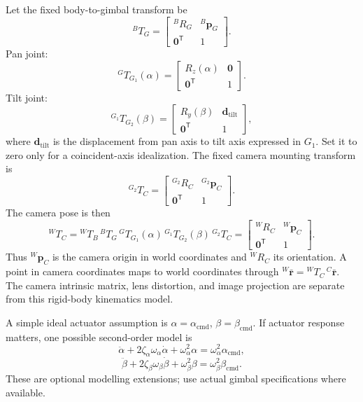 \documentclass[11pt,a4paper]{article}
\begin{document}
Let the fixed body-to-gimbal transform be
\[
{}^BT_G=\begin{bmatrix}{}^BR_G&{}^B\mathbf p_G\\\mathbf0^{\mathsf T}&1\end{bmatrix}.
\]
Pan joint:
\[
{}^GT_{G_1}(\alpha)=
\begin{bmatrix}R_z(\alpha)&\mathbf0\\\mathbf0^{\mathsf T}&1\end{bmatrix}.
\]
Tilt joint:
\[
{}^{G_1}T_{G_2}(\beta)=
\begin{bmatrix}R_y(\beta)&\mathbf d_{\mathrm{tilt}}\\\mathbf0^{\mathsf T}&1\end{bmatrix},
\]
where \(\mathbf d_{\mathrm{tilt}}\) is the displacement from pan axis to tilt axis expressed in \(G_1\). Set it to zero only for a coincident-axis idealization. The fixed camera mounting transform is
\[
{}^{G_2}T_C=\begin{bmatrix}{}^{G_2}R_C&{}^{G_2}\mathbf p_C\\\mathbf0^{\mathsf T}&1\end{bmatrix}.
\]
The camera pose is then
\[
{}^WT_C={}^WT_B\,{}^BT_G\,{}^GT_{G_1}(\alpha)\,
{}^{G_1}T_{G_2}(\beta)\,{}^{G_2}T_C
=\begin{bmatrix}{}^WR_C&{}^W\mathbf p_C\\\mathbf0^{\mathsf T}&1\end{bmatrix}.
\]
Thus \({}^W\mathbf p_C\) is the camera origin in world coordinates and \({}^WR_C\) its orientation. A point in camera coordinates maps to world coordinates through \({}^W\bar{\mathbf r}={}^WT_C\,{}^C\bar{\mathbf r}\). The camera intrinsic matrix, lens distortion, and image projection are separate from this rigid-body kinematics model.

A simple ideal actuator assumption is \(\alpha=\alpha_{\mathrm{cmd}}\), \(\beta=\beta_{\mathrm{cmd}}\). If actuator response matters, one possible second-order model is
\[
\ddot\alpha+2\zeta_\alpha\omega_\alpha\dot\alpha+
\omega_\alpha^2\alpha=\omega_\alpha^2\alpha_{\mathrm{cmd}},
\]
\[
\ddot\beta+2\zeta_\beta\omega_\beta\dot\beta+
\omega_\beta^2\beta=\omega_\beta^2\beta_{\mathrm{cmd}}.
\]
These are optional modelling extensions; use actual gimbal specifications where available.
\end{document}
